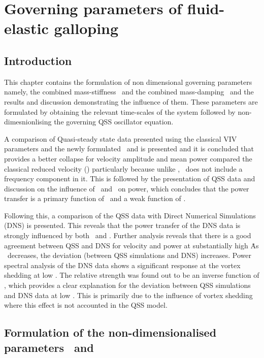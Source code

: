 \chapter{Governing parameters of  fluid-elastic galloping}
\label{chap:goven_para}

\section{Introduction}

This chapter contains the formulation of non dimensional governing parameters namely, the combined mass-stiffness \massstiff \ and the combined mass-damping \massdamp \ and the results and discussion demonstrating the influence of them. These parameters are formulated by obtaining the relevant time-scales of the system followed by non-dimesnionlising the governing QSS oscillator equation.  

A comparison of Quasi-steady state data presented using the classical VIV parameters and the newly formulated \massstiff \ and \massdamp is presented and it is concluded that \massdamp provides a better collapse for velocity amplitude and mean power compared the classical reduced velocity (\ustar) particularly because unlike \ustar, \massdamp \ does not include a frequency component in it. This is followed by the presentation of QSS data and discussion on the influence of \massstiff \ and \massdamp \ on power, which concludes that the power transfer is a primary function of \massdamp \ and a weak function of \massstiff.

Following this, a comparison of the QSS data with Direct Numerical Simulations (DNS) is presented. This reveals that the power transfer of the DNS data is strongly influenced by both \massstiff \ and \massdamp. Further analysis reveals that there is a good agreement between QSS and DNS for velocity and power at substantially high \massstiff\. As \massstiff \ decreases, the deviation (between QSS simulations and DNS) increases. Power spectral analysis of the DNS data shows a significant response at the vortex shedding at low \massstiff. The relative strength was found out to be an inverse function of \massstiff, which provides a clear explanation for the deviation between QSS simulations and DNS data at low \massstiff. This is primarily due to the influence of vortex shedding where this effect is not accounted in the QSS model.


\section{Formulation of the non-dimensionalised parameters \massstiff \ and \massdamp }

